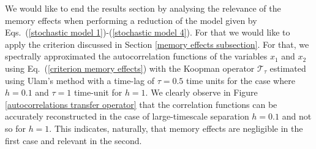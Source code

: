 \documentclass[12pt]{article}
\begin{document}
We would like to end the results section by analysing the relevance of the memory effects when performing a reduction of the model given by Eqs.~(\ref{stochastic model 1})-(\ref{stochastic model 4}). For that we would like to apply the criterion discussed in Section \ref{memory effects subsection}. For that, we spectrally approximated the autocorrelation functions of the variables $x_1$ and $x_2$ using Eq.~({\ref{criterion memory effects}}) with the Koopman operator $\mathcal{T}_{\tau}$ estimated using Ulam's method with a time-lag of $\tau=0.5$ time units for the case where $h=0.1$ and $\tau=1$ time-unit for $h=1$. We clearly observe in Figure \ref{autocorrelations transfer operator} that the correlation functions can be accurately reconstructed in the case of large-timescale separation $h=0.1$ and not so for $h=1$. This indicates, naturally, that memory effects are negligible in the first case and relevant in the second.
\end{document}
